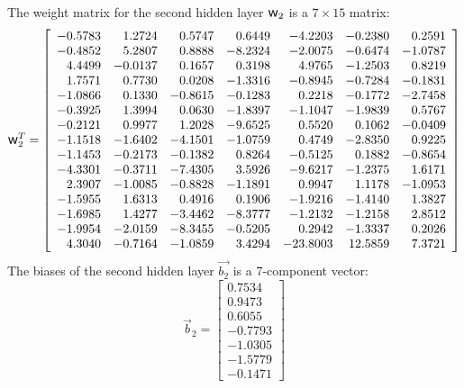 \documentclass[metals,article,submit,pdftex,moreauthors]{Definitions/mdpi}
\DeclareRobustCommand{\w}{\mbox{\large\ensuremath{\mathsf{w}}}}
\begin{document}
The weight matrix for the second hidden layer $\w_2$ is a $7\times15$ matrix:
\begin{equation*}
\w_2^T = \left[
\begin{array}{rrrrrrr}
	-0.5783 & 1.2724  & 0.5747  & 0.6449  & -4.2203  & -0.2380 & 0.2591  \\
	-0.4852 & 5.2807  & 0.8888  & -8.2324 & -2.0075  & -0.6474 & -1.0787 \\
	4.4499  & -0.0137 & 0.1657  & 0.3198  & 4.9765   & -1.2503 & 0.8219  \\
	1.7571  & 0.7730  & 0.0208  & -1.3316 & -0.8945  & -0.7284 & -0.1831 \\
	-1.0866 & 0.1330  & -0.8615 & -0.1283 & 0.2218   & -0.1772 & -2.7458 \\
	-0.3925 & 1.3994  & 0.0630  & -1.8397 & -1.1047  & -1.9839 & 0.5767  \\
	-0.2121 & 0.9977  & 1.2028  & -9.6525 & 0.5520   & 0.1062  & -0.0409 \\
	-1.1518 & -1.6402 & -4.1501 & -1.0759 & 0.4749   & -2.8350 & 0.9225  \\
	-1.1453 & -0.2173 & -0.1382 & 0.8264  & -0.5125  & 0.1882  & -0.8654 \\
	-4.3301 & -0.3711 & -7.4305 & 3.5926  & -9.6217  & -1.2375 & 1.6171  \\
	2.3907  & -1.0085 & -0.8828 & -1.1891 & 0.9947   & 1.1178  & -1.0953 \\
	-1.5955 & 1.6313  & 0.4916  & 0.1906  & -1.9216  & -1.4140 & 1.3827  \\
	-1.6985 & 1.4277  & -3.4462 & -8.3777 & -1.2132  & -1.2158 & 2.8512  \\
	-1.9954 & -2.0159 & -8.3455 & -0.5205 & 0.2942   & -1.3337 & 0.2026  \\
	4.3040  & -0.7164 & -1.0859 & 3.4294  & -23.8003 & 12.5859 & 7.3721
\end{array}\right]
\end{equation*}
The biases of the second hidden layer $\overrightarrow{b_2}$ is a 7-component vector:
\begin{equation*}
\overrightarrow{b}_2 = \left[
\begin{array}{r}
	0.7534  \\
	0.9473  \\
	0.6055  \\
	-0.7793 \\
	-1.0305 \\
	-1.5779 \\
	-0.1471
\end{array}\right]
\end{equation*}
\end{document}
